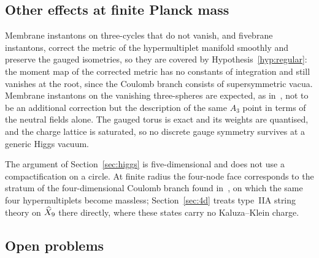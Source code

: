 \subsection{Other effects at finite Planck mass}
\label{subsec:other-effects}

Membrane instantons on three-cycles that do not vanish, and fivebrane instantons, correct the
metric of the hypermultiplet manifold smoothly and preserve the gauged isometries, so they are
covered by Hypothesis~\ref{hyp:regular}: the moment map of the corrected metric has no constants
of integration and still vanishes at the root, since the Coulomb branch consists of
supersymmetric vacua. Membrane instantons on the vanishing three-spheres are expected, as
in~\cite{OoguriVafa:1996,SeibergShenker:1996}, not to be an additional correction but the
description of the same $A_3$ point in terms of the neutral fields alone. The gauged torus is
exact and its weights are quantised, and the charge lattice is saturated, so no discrete gauge symmetry survives at a generic Higgs vacuum.

The argument of Section~\ref{sec:higgs} is five-dimensional and does not use a compactification on
a circle. At finite radius the four-node face corresponds to the stratum of the four-dimensional
Coulomb branch found in~\cite[Sects.~5.1--5.2]{W26quantum}, on which the same four hypermultiplets
become massless; Section~\ref{sec:4d} treats type~IIA string theory on $\widehat X_9$ there directly, where
these states carry no Kaluza--Klein charge.

\subsection{Open problems}
\label{subsec:open}

